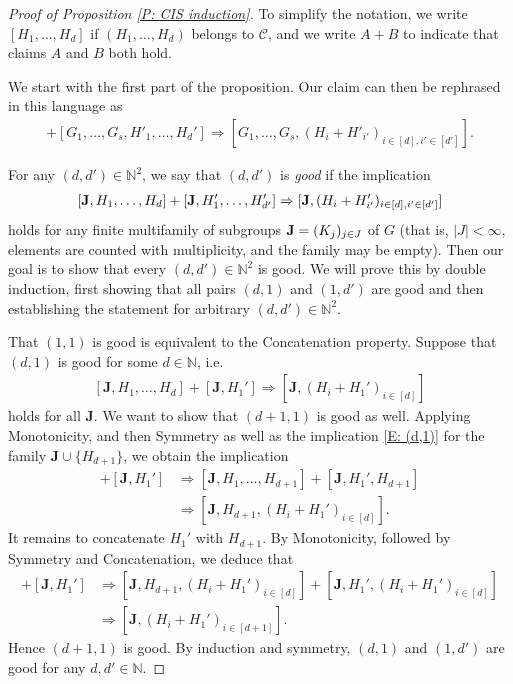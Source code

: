 \documentclass[11pt]{amsart}
\theoremstyle{definition}
\newcommand{\N}{{\mathbb N}}
\newcommand{\bJ}{{\mathbf{J}}}
\newcommand{\1}{{\mathbf{1}}}
\begin{document}
\begin{proof}[Proof of Proposition \ref{P: CIS induction}]

To simplify the notation, we write $[H_{1},\dots,H_{d}]$ if $(H_{1},\dots,H_{d})$ belongs to $\mathcal{C}$, and we write $A+B$ to indicate that claims $A$ and $B$ both hold.

We start with the first part of the proposition.  Our claim can then be rephrased in this language as
\begin{align*}
    [G_1, \ldots, G_s, H_1, \ldots, H_d] + [G_1, \ldots, G_s, H'_1, \ldots, H_d'] \Rightarrow   [G_1, \ldots, G_s, (H_{i}+H'_{i'})_{i\in[d], i'\in[d']}].
\end{align*}

For any $(d,d')\in\N^2$, we say that $(d,d')$ is \textit{good} if the implication
	\begin{equation}\label{E: (d,d')}
	\begin{split}
	[\bold{J},H_{1},\dots,H_d]+[\bold{J},H'_{1},\dots,H'_{d'}]
	\Rightarrow[\bold{J},(H_{i}+H'_{i'})_{i\in[d], i'\in[d']}]
	\end{split}
	\end{equation} 
	holds for any finite multifamily of subgroups $\bold{J}=(K_{j})_{j\in J}$ of $G$ (that is, $\vert J\vert<\infty$, elements are counted with multiplicity, and the family may be empty).
	Then our goal is to show that every $(d,d')\in\N^2$ is good. We will prove this by double induction, first showing that all pairs $(d,1)$ and $(1,d')$ are good and then establishing the statement for arbitrary $(d,d')\in\N^2$.
    
    That $(1,1)$ is good is equivalent to the Concatenation property. Suppose that $(d,1)$ is good for some $d\in\N$, i.e. 
    \begin{align}\label{E: (d,1)}
        [\bJ, H_1, \ldots, H_d] + [\bJ, H_1'] \Rightarrow [\bJ, (H_i+H_1')_{i\in[d]}]
    \end{align}
    holds for all $\bJ$. We want to show that $(d+1,1)$ is good as well. Applying Monotonicity, and then Symmetry as well as the implication \eqref{E: (d,1)} for the family $\bJ\cup\{H_{d+1}\}$, we obtain the implication
    \begin{align*}
        [\bJ, H_1, \ldots, H_{d+1}] + [\bJ, H_1'] &\Rightarrow [\bJ, H_1, \ldots, H_{d+1}] + [\bJ, H_1', H_{d+1}]\\
        &\Rightarrow [\bJ, H_{d+1}, (H_i+H_1')_{i\in[d]}].
    \end{align*}
    It remains to concatenate $H_1'$ with $H_{d+1}$. By Monotonicity, followed by Symmetry and Concatenation,
    we deduce that
    \begin{align*}
        [\bJ, H_{d+1}, (H_i+H_1')_{i\in[d]}] + [\bJ, H_1'] &\Rightarrow [\bJ, H_{d+1}, (H_i+H_1')_{i\in[d]}] + [\bJ, H_1', (H_i+H_1')_{i\in[d]}]\\
        &\Rightarrow [\bJ, (H_i+H_1')_{i\in[d+1]}].
    \end{align*}
    Hence $(d+1,1)$ is good. By induction and symmetry, $(d,1)$ and $(1,d')$ are good for any $d,d'\in\N$.


\end{proof}
\end{document}
